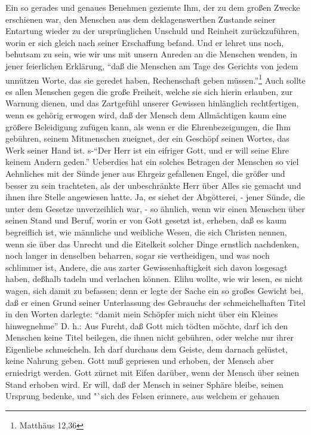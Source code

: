 Ein so gerades und genaues Benehmen geziemte Ihm, der zu dem großen Zwecke
erschienen war, den Menschen aus dem deklagenswerthen Zustande seiner Entartung
wieder zu der ursprünglichen Unschuld und Reinheit zurückzuführen, worin er sich
gleich nach seiner Erschaffung befand. Und er lehret uns noch, behutsam zu sein,
wie wir uns mit unsern Anreden an die Menschen wenden, in jener feierlichen
Erklärung, "`daß die Menschen am Tage des Gerichts von jedem unnützen Worte, das
sie geredet haben, Rechenschaft geben müssen."'\footnote{Matthäus 12,36} Auch
sollte es allen Menschen gegen die große Freiheit, welche sie sich hierin
erlauben, zur Warnung dienen, und das Zartgefühl unserer Gewissen hinlänglich
rechtfertigen, wenn es gehörig erwogen wird, daß der Mensch dem Allmächtigen
kaum eine größere Beleidigung zufügen kann, als wenn er die Ehrenbezeigungen,
die Ihm gebühren, seinem Mitmenschen zueignet, der ein Geschöpf seinen Wortes,
das Werk seiner Hand ist. s-"`Der Herr ist ein eifriger Gott, und er will seine
Ehre keinem Andern geden."' Ueberdies hat ein solches Betragen der Menschen so
viel Aehnliches mit der Sünde jener aus Ehrgeiz gefallenen Engel, die größer und
besser zu sein trachteten, als der unbeschränkte Herr über Alles sie gemacht und
ihnen ihre Stelle angewiesen hatte. Ja, es siehet der Abgötterei, - jener Sünde,
die unter dem Gesetze unverzeihlich war, - so ähnlich, wenn wir einen Menschen
über seinen Stand und Beruf, worin er von Gott gesetzt ist, erheben, daß es kaum
begreiflich ist, wie männliche und weibliche Wesen, die sich Christen nennen,
wenn sie über das Unrecht und die Eitelkeit solcher Dinge ernstlich nachdenken,
noch langer in denselben beharren, sogar sie vertheidigen, und was noch
schlimmer ist, Andere, die aus zarter Gewissenhaftigkeit sich davon losgesagt
haben, deßhalb tadeln und verlachen können. Elihu wollte, wie wir lesen, es
nicht wagen, sich damit zu befassen; denn er legte der Sache ein so großes
Gewicht bei, daß er einen Grund seiner Unterlassung des Gebrauchs der
schmeichelhaften Titel in den Worten darlegte: "`damit mein Schöpfer mich nicht
über ein Kleines hinwegnehme"' D. h.: Aus Furcht, daß Gott mich tödten möchte,
darf ich den Menschen keine Titel beilegen, die ihnen nicht gebühren, oder
welche nur ihrer Eigenliebe schmeicheln. Ich darf durchaus dem Geiste, dem
darnach gelüstet, keine Nahrung geben. Gott muß gepriesen und erhoben, der
Mensch aber erniedrigt werden. Gott zürnet mit Eifen darüber, wenn der Mensch
über seinen Stand erhoben wird. Er will, daß der Mensch in seiner Sphäre bleibe,
seinen Ursprung bedenke, und "`sich des Felsen erinnere, aus welchem er gehauen
